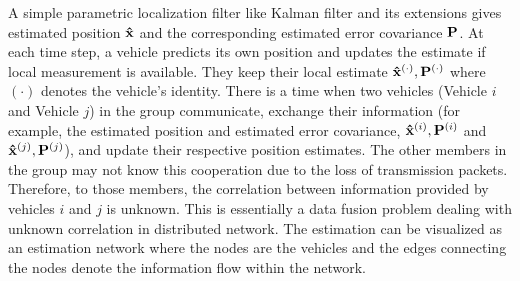 A simple parametric localization filter like Kalman filter \cite{kalman1960new} and its extensions \cite{kalman1960new,KFbook,Julier2004} gives estimated position ${\bf \hat x}$ and the corresponding estimated error covariance ${\bf P}$. At each time step, a vehicle predicts its own position and updates the estimate if local measurement is available. They keep their local estimate ${\bf\hat x}^{(\cdot)},{\bf P}^{(\cdot)}$ where $(\cdot)$ denotes the vehicle's identity. There is a time when two vehicles (Vehicle $i$ and Vehicle $j$) in the group communicate, exchange their information (for example, the estimated position and estimated error covariance, ${\bf\hat x}^{(i)},{\bf P}^{(i)}$ and ${\bf\hat x}^{(j)},{\bf P}^{(j)}$), and update their respective position estimates. The other members in the group may not know this cooperation due to the loss of transmission packets. Therefore, to those members, the correlation between information provided by vehicles $i$ and $j$ is unknown. This is essentially a data fusion problem dealing with unknown correlation in distributed network. The estimation can be visualized as an estimation network where the nodes are the vehicles and the edges connecting the nodes denote the information flow within the network.

